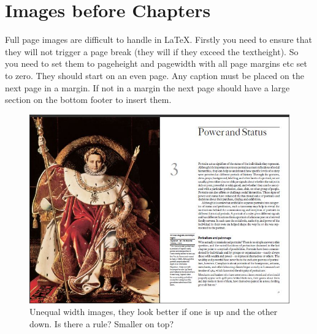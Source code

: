 \documentclass{book}
\begin{document}
\section{Images before Chapters}
Full page images are difficult to handle in LaTeX. Firstly you need to ensure that they will not trigger a page break (they will if they exceed the textheight). So you need to set  them to pageheight and pagewidth with all page margins etc set to zero. They should start on an even page. Any caption must be placed on the next page in a margin. If not in a margin the next page should have a large section on the bottom footer to insert them. 
\begin{figure}[bt]
  \hspace*{-\marginparwidth} \includegraphics[width=\dimexpr(\textwidth+\marginparwidth)]{1-chapter}
  \caption{Unequal width images, they look better if one is up and the other down. Is there a rule? Smaller on top?}
\end{figure}
\end{document}
